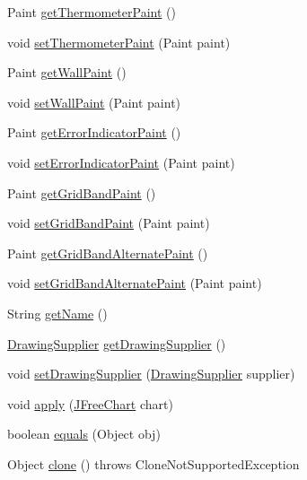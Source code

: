 \begin{DoxyCompactItemize}
\item 
Paint \mbox{\hyperlink{classorg_1_1jfree_1_1chart_1_1_standard_chart_theme_a36af217e64d242998f929ff25f632c57}{get\+Thermometer\+Paint}} ()
\item 
void \mbox{\hyperlink{classorg_1_1jfree_1_1chart_1_1_standard_chart_theme_a581aacf90e7f0e85d5365218c2d635b4}{set\+Thermometer\+Paint}} (Paint paint)
\item 
Paint \mbox{\hyperlink{classorg_1_1jfree_1_1chart_1_1_standard_chart_theme_af3f47a3bc67bcc6e31299eb75e19bd2c}{get\+Wall\+Paint}} ()
\item 
void \mbox{\hyperlink{classorg_1_1jfree_1_1chart_1_1_standard_chart_theme_ad557cec57bc9f3888e819d1cf866ebc6}{set\+Wall\+Paint}} (Paint paint)
\item 
Paint \mbox{\hyperlink{classorg_1_1jfree_1_1chart_1_1_standard_chart_theme_a4dc50edcfef0ad19319267af81788654}{get\+Error\+Indicator\+Paint}} ()
\item 
void \mbox{\hyperlink{classorg_1_1jfree_1_1chart_1_1_standard_chart_theme_ad96237806fc1b9d3c709a0c972ae0519}{set\+Error\+Indicator\+Paint}} (Paint paint)
\item 
Paint \mbox{\hyperlink{classorg_1_1jfree_1_1chart_1_1_standard_chart_theme_aa3daf85d499182e7c15b01e65e7ef569}{get\+Grid\+Band\+Paint}} ()
\item 
void \mbox{\hyperlink{classorg_1_1jfree_1_1chart_1_1_standard_chart_theme_a6c4f54c13a6b54deeaca77e4b13e35fd}{set\+Grid\+Band\+Paint}} (Paint paint)
\item 
Paint \mbox{\hyperlink{classorg_1_1jfree_1_1chart_1_1_standard_chart_theme_a71a0211f432b4f5c545cdb4850492730}{get\+Grid\+Band\+Alternate\+Paint}} ()
\item 
void \mbox{\hyperlink{classorg_1_1jfree_1_1chart_1_1_standard_chart_theme_aec5241d250f54281250b41e088b8fbd6}{set\+Grid\+Band\+Alternate\+Paint}} (Paint paint)
\item 
String \mbox{\hyperlink{classorg_1_1jfree_1_1chart_1_1_standard_chart_theme_abd78360170f9a355ebc5e80ea3ea064e}{get\+Name}} ()
\item 
\mbox{\hyperlink{interfaceorg_1_1jfree_1_1chart_1_1plot_1_1_drawing_supplier}{Drawing\+Supplier}} \mbox{\hyperlink{classorg_1_1jfree_1_1chart_1_1_standard_chart_theme_ae65c77546155e63cdbd2f84a003c1321}{get\+Drawing\+Supplier}} ()
\item 
void \mbox{\hyperlink{classorg_1_1jfree_1_1chart_1_1_standard_chart_theme_a0ba32a6320e8d58ec22edfc7e024f811}{set\+Drawing\+Supplier}} (\mbox{\hyperlink{interfaceorg_1_1jfree_1_1chart_1_1plot_1_1_drawing_supplier}{Drawing\+Supplier}} supplier)
\item 
void \mbox{\hyperlink{classorg_1_1jfree_1_1chart_1_1_standard_chart_theme_a70be2e38a735bc70a8da19ba525ab536}{apply}} (\mbox{\hyperlink{classorg_1_1jfree_1_1chart_1_1_j_free_chart}{J\+Free\+Chart}} chart)
\item 
boolean \mbox{\hyperlink{classorg_1_1jfree_1_1chart_1_1_standard_chart_theme_a51d75379cbcddee8895451826b4c11c3}{equals}} (Object obj)
\item 
Object \mbox{\hyperlink{classorg_1_1jfree_1_1chart_1_1_standard_chart_theme_a6227dbed3c6316535e8aaabfea9c76f9}{clone}} ()  throws Clone\+Not\+Supported\+Exception 
\end{DoxyCompactItemize}
